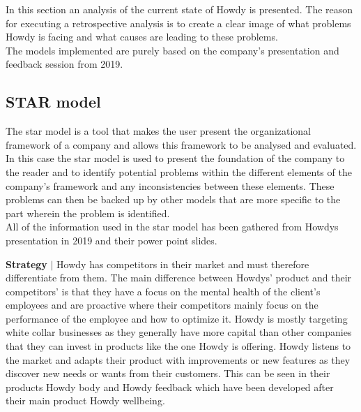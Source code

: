 

\noindent In this section an analysis of the current state of Howdy is presented. The reason for executing a retrospective analysis is to create a clear image of what problems Howdy is facing and what causes are leading to these problems.\\
\noindent The models implemented are purely based on the company’s presentation and feedback session from 2019.



\subsection{STAR model}
The star model is a tool that makes the user present the organizational framework of a company and allows this framework to be analysed and evaluated. In this case the star model is used to present the foundation of the company to the reader and to identify potential problems within the different elements of the company’s framework and any inconsistencies between these elements. These problems can then be backed up by other models that are more specific to the part wherein the problem is identified.\\
\noindent All of the information used in the star model has been gathered from Howdys presentation in 2019 and their power point slides\cite{oneofthepresentations}.

\noindent \textbf{Strategy} $|$ Howdy has competitors in their market and must therefore differentiate from them. The main difference between Howdys' product and their competitors' is that they have a focus on the mental health of the client’s employees and are proactive where their competitors mainly focus on the performance of the employee and how to optimize it. Howdy is mostly targeting white collar businesses as they generally have more capital than other companies that they can invest in products like the one Howdy is offering.
Howdy listens to the market and adapts their product with improvements or new features as they discover new needs or wants from their customers. This can be seen in their products Howdy body and Howdy feedback which have been developed after their main product Howdy wellbeing.

